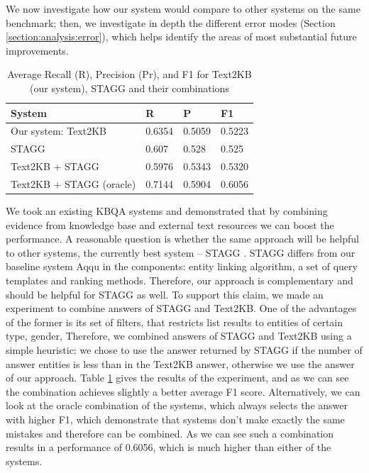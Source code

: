 We now investigate how our system would compare to other systems on the same benchmark; then, we investigate in depth the different error modes (Section \ref{section:analysis:error}), which helps identify the areas of most substantial future improvements. 

\begin{table}
\centering
\caption{Average Recall (R), Precision (Pr), and F1 for Text2KB (our system), STAGG and their combinations}
\label{table:combine_stagg}
\begin{tabular}{| p{4cm} | p{1cm} | p{1cm} | p{1cm} | }
\hline
System & R & P & F1 \\
\hline
Our system: Text2KB & 0.6354 & 0.5059 & 0.5223 \\
STAGG \cite{yih2015semantic} & 0.607 & 0.528 & 0.525\\
\hline
Text2KB + STAGG & 0.5976 & 0.5343 & 0.5320 \\
Text2KB + STAGG (oracle) & 0.7144 & 0.5904 & 0.6056 \\
\hline
\end{tabular}
\end{table}

We took an existing KBQA systems and demonstrated that by combining evidence from knowledge base and external text resources we can boost the performance.
A reasonable question is whether the same approach will be helpful to other systems, \eg the currently best system -- STAGG \cite{yih2015semantic}.
STAGG differs from our baseline system Aqqu in the components: entity linking algorithm, a set of query templates and ranking methods.
Therefore, our approach is complementary and should be helpful for STAGG as well.
To support this claim, we made an experiment to combine answers of STAGG and Text2KB.
One of the advantages of the former is its set of filters, that restricts list results to entities of certain type, gender, \etc
Therefore, we combined answers of STAGG and Text2KB using a simple heuristic: we chose to use the answer returned by STAGG if the number of answer entities is less than in the Text2KB answer, otherwise we use the answer of our approach.
Table \ref{table:combine_stagg} gives the results of the experiment, and as we can see the combination achieves slightly a better average F1 score.
Alternatively, we can look at the oracle combination of the systems, which always selects the answer with higher F1, which demonstrate that systems don't make exactly the same mistakes and therefore can be combined.
As we can see such a combination results in a performance of 0.6056, which is much higher than either of the systems.

